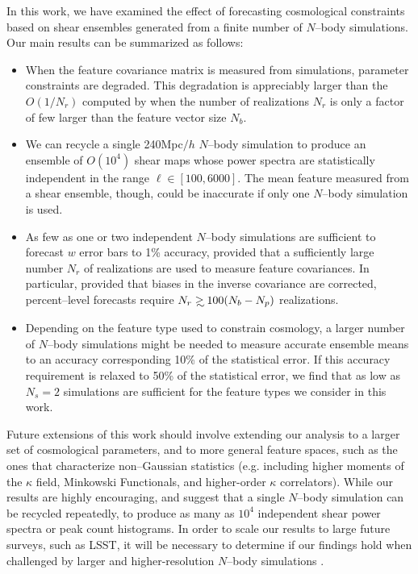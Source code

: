 \documentclass[reprint,aps,prd,superscriptaddress,showkeys,showpacs]{revtex4-1}
\newcommand\gsim{\mathrel{\rlap{\lower4pt\hbox{\hskip1pt$\sim$}}
        \raise1pt\hbox{$>$}}}
\begin{document}
In this work, we have examined the effect of forecasting cosmological
constraints based on shear ensembles generated from a finite number of
$N$--body simulations.  Our main results can be summarized as follows:
\vspace{0.4\baselineskip}
\begin{itemize}

\item When the feature covariance matrix is measured from simulations,
  parameter constraints are degraded. This degradation is appreciably
  larger than the $O(1/N_r)$ computed by \citep{DodelsonSchneider13}
  when the number of realizations $N_r$ is only a factor of few larger
  than the feature vector size $N_b$.
\item We can recycle a single 240Mpc$/h$ $N$--body simulation to produce an
  ensemble of $O(10^4)$ shear maps whose power spectra are statistically independent in the range $\ell\in[100,6000]$. The mean feature measured
  from a shear ensemble, though, could be inaccurate if only one $N$--body simulation is used.
\item As few as one or two independent $N$--body simulations are
  sufficient to forecast $w$ error bars to 1\% accuracy, provided that
  a sufficiently large number $N_r$ of realizations are used to
  measure feature covariances.  In particular, provided that biases
  in the inverse covariance are corrected, percent--level forecasts
  require $N_r\gsim 100 (N_b-N_p)$ realizations.
\item Depending on the feature type used to constrain cosmology, a
  larger number of $N$--body simulations might be needed to measure
  accurate ensemble means to an accuracy corresponding 10\% of the
  statistical error. If this accuracy requirement is relaxed to 50\%
  of the statistical error, we find that as low as $N_s=2$ simulations
  are sufficient for the feature types we consider in this work.
\end{itemize}
%
Future extensions of this work should involve extending our analysis
to a larger set of cosmological parameters, and to more general
feature spaces, such as the ones that characterize non--Gaussian
statistics (e.g. including higher moments of the $\kappa$ field,
Minkowski Functionals, and higher-order $\kappa$ correlators). While
our results are highly encouraging, and suggest that a single $N$--body
simulation can be recycled repeatedly, to produce as many as $10^4$
independent shear power spectra or peak count histograms. In order to
scale our results to large future surveys, such as LSST, it will be
necessary to determine if our findings hold when challenged by larger
and higher-resolution $N$--body simulations \citep{Qcontinuum}.
\end{document}
